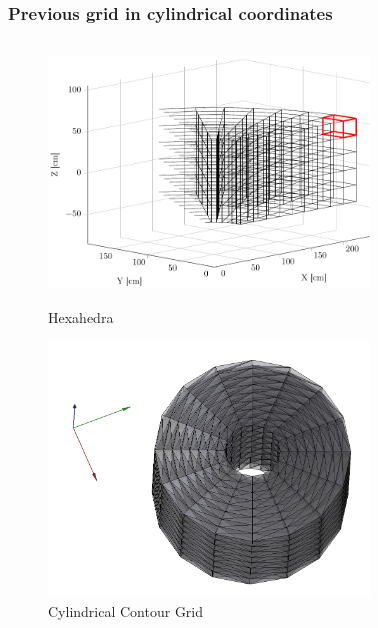 \documentclass{beamer}
\begin{document}
\begin{frame}
\frametitle{Previous grid in cylindrical coordinates}
\vspace{-1.5 cm}
\begin{columns}[onlytextwidth]
	\begin{column}{0.5\textwidth}
		\begin{center}
			\begin{figure}
				\includegraphics[trim={0 1cm 0 2cm},clip,width=0.8\textwidth]{FIGURES/3d_grid_sketch_torus.pdf}
				\caption{Hexahedra}
				\vspace{-0.2 cm}
				\includegraphics[trim={0 1cm 0 2cm},clip,width=0.8\textwidth]{FIGURES/full_grid_rect.png}
				\caption{Cylindrical Contour Grid}
			\end{figure}
		\end{center}
	\end{column}
	\begin{column}{0.48\textwidth}
		\vspace{-0cm}
		\begin{center}

\end{center}
\end{column}
\end{columns}
\end{frame}
\end{document}
